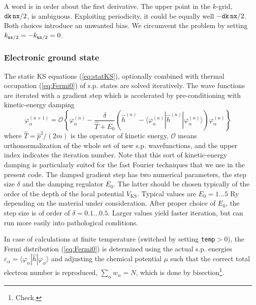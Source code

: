\documentclass[final,1p]{elsarticle}
\newcommand{\PGRfoot}[1]{{\color{blue}\footnote{\color{blue} #1}}}
\begin{document}
A word is in order about the first derivative. The upper point in the
$k$-grid, ${\tt dk}\,{\tt nx}/2$, is ambiguous. Exploiting periodicity,
it could be equally well $-{\tt dk}\,{\tt nx}/2$. 
Both choices introduce an unwanted bias. 
We circumvent the problem by setting 
$k_{{\tt nx}/2}=-k_{{\tt nx}/2}=0$. 





\subsubsection{Electronic ground state}
\label{sec:numstaticel}


The static KS equations (\ref{eq:statKS}), optionally combined with
thermal occupation (\ref{eq:Fermi0}) of s.p. states are solved
iteratively. The wave functions are iterated with a gradient step
which is accelerated by pre-conditioning with kinetic-energy
damping~\cite{Rei82a,Blu92}
\begin{equation}
  \varphi_\alpha^{(n+1)}
  =
  \mathcal{O}\left\{
    \varphi_\alpha^{(n)} 
    - 
    \frac{\delta}{\hat{T} + E_0} 
    \left( \hat{h}^{(n)} - 
      \langle\varphi_\alpha^{(n)}|\hat{h}^{(n)}|\varphi_\alpha^{(n)}\rangle
    \right)\varphi_\alpha^{(n)}\right\}
  \label{eq:dampstep}
\end{equation}
where $\hat{T}=\hat{p}^2/(2m)$ is the operator of kinetic energy,
$\mathcal{O}$ means orthonormalization of the whole set of new
s.p. wavefunctions, and the upper index indicates the iteration
number.  Note that this sort of kinetic-energy damping is particularly
suited for the fast Fourier techniques that we use in the present
code.  The damped gradient step has two numerical parameters, the step
size $\delta$ and the damping regulator $E_0$. The latter should be
chosen typically of the order of the depth of the local potential
$V_\mathrm{KS}$. Typical values are $E_0=1...5$ Ry depending on the
material under consideration. After proper choice of $E_0$, the step
size is of order of $\delta=0.1...0.5$. Larger values yield faster
iteration, but can run more easily into pathological conditions.


In case of calculations at finite temperature (switched by setting
{\tt temp}$>0$), the Fermi distribution (\ref{eq:Fermi0}) is
determined using the actual s.p. energies
$\varepsilon_\alpha=\langle\varphi_\alpha|\hat{h}|\varphi_\alpha\rangle$
and adjusting the chemical potential $\mu$ such that the correct total
electron number is reproduced, $\sum_\alpha w_\alpha=N$, which is done
by bisection\PGRfoot{Check.}.
\end{document}
